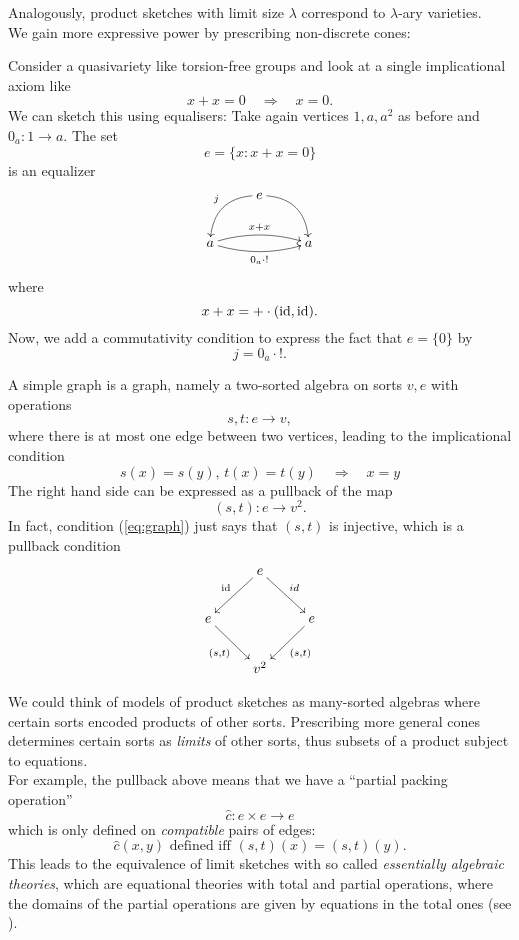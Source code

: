 Analogously, product sketches with limit size $\lambda$ correspond to $\lambda$-ary varieties. \\

We gain more expressive power by prescribing non-discrete cones:

\begin{Example}
Consider a quasivariety like torsion-free groups and look at a single implicational axiom like
\[ x + x = 0 \quad \Rightarrow \quad x = 0. \]
We can sketch this using equalisers: Take again vertices $1,a,a^2$ as before and $0_a : 1 \to a$. The set
\[ e = \{ x : x + x = 0 \} \]
is an equalizer
\[
\xymatrix{
& e \ar@/_1pc/[ld]_{j} \ar@/^1pc/[rd] & \\
a \ar@/^/[rr]^{x + x} \ar@/_/[rr]_{0_a \circ !} & & a
}\]
where \[ x + x = + \cdot (\textrm{id},\textrm{id}). \]
Now, we add a commutativity condition to express the fact that $e = \{0\}$ by \[ j = 0_a\cdot !. \]
\end{Example}

\begin{Example}
A simple graph is a graph, namely a two-sorted algebra on sorts $v,e$ with operations
\[ s, t : e \to v, \]
where there is at most one edge between two vertices, leading to the implicational condition
\begin{equation}\label{eq:graph} s(x) = s(y),\, t(x) = t(y) \quad \Rightarrow \quad x = y \end{equation}
The right hand side can be expressed as a pullback of the map \[ (s,t) : e \to v^2. \]
In fact, condition (\ref{eq:graph}) just says that $(s,t)$ is injective, which is a pullback condition
\[
\xymatrix{
 & e \ar[ld]_{\id} \ar[rd]^{id} & \\
e \ar[rd]_{(s,t)} &  & e \ar[ld]^{(s,t)} \\
 & v^2 &
}\]
\end{Example}

We could think of models of product sketches as many-sorted algebras where certain sorts encoded products of other sorts. Prescribing more general cones determines certain sorts as \emph{limits} of other sorts, thus subsets of a product subject to equations. \\

For example, the pullback above means that we have a ``partial packing operation'' \[ \hat c : e \times e \to e \] which is only defined on \emph{compatible} pairs of edges:
\[ \hat c(x,y) \text{ defined iff } (s,t)(x) = (s,t)(y). \]
This leads to the equivalence of limit sketches with so called \emph{essentially algebraic theories}, which are equational theories with total and partial operations, where the domains of the partial operations are given by equations in the total ones (see \cite[Chapter 3.D]{AdamekRosicky}). \\

